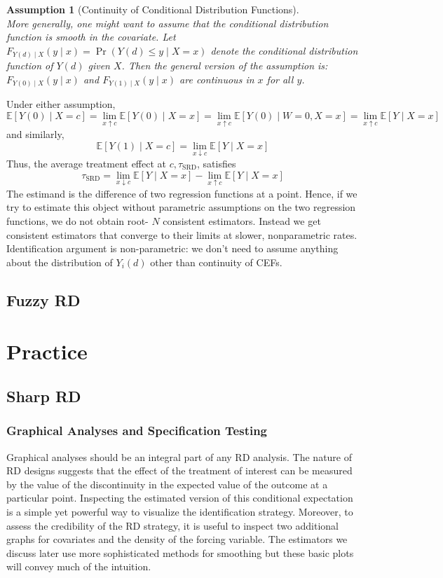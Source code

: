 \documentclass[11pt]{book}%
\newtheorem{assu}{Assumption}
\begin{document}
\begin{assu}[Continuity of Conditional Distribution Functions] 
	~\\
	More generally, one might want to assume that the conditional distribution function is smooth in the covariate. Let $F_{Y(d) \mid X}(y \mid x)=\operatorname{Pr}(Y(d) \leqslant y \mid X=x)$ denote the conditional distribution function of $Y(d)$ given $X$. Then the general version of the assumption is:
$F_{Y(0) \mid X}(y \mid x)$ and $F_{Y(1) \mid X}(y \mid x)$
are continuous in $x$ for all $y$.
\end{assu}
Under either assumption,
$$
\mathbb{E}[Y(0) \mid X=c]=\lim _{x \uparrow c} \mathbb{E}[Y(0) \mid X=x]=\lim _{x \uparrow c} \mathbb{E}[Y(0) \mid W=0, X=x]=\lim _{x \uparrow c} \mathbb{E}[Y \mid X=x]
$$
and similarly,
$$
\mathbb{E}[Y(1) \mid X=c]=\lim _{x \downarrow c} \mathbb{E}[Y \mid X=x]
$$
Thus, the average treatment effect at $c, \tau_{\mathrm{SRD}}$, satisfies
$$
\tau_{\mathrm{SRD}}=\lim _{x \downarrow c} \mathbb{E}[Y \mid X=x]-\lim _{x \uparrow c} \mathbb{E}[Y \mid X=x]
$$
The estimand is the difference of two regression functions at a point. Hence, if we try to estimate this object without parametric assumptions on the two regression functions, we do not obtain root- $N$ consistent estimators. Instead we get consistent estimators that converge to their limits at slower, nonparametric rates.
Identification argument is non-parametric: we don't need to assume anything about the distribution of $Y_{ i}(d)$ other than continuity of CEFs.


\subsection{Fuzzy RD}

\section{Practice}
\subsection{Sharp RD}
\subsubsection{Graphical Analyses and Specification Testing}
Graphical analyses should be an integral part of any RD analysis. The nature of RD designs suggests that the effect of the treatment of interest can be measured by the value of the discontinuity in the expected value of the outcome at a particular point. Inspecting the estimated version of this conditional expectation is a simple yet powerful way to visualize the identification strategy. Moreover, to assess the credibility of the RD strategy, it is useful to inspect two additional graphs for covariates and the density of the forcing variable. The estimators we discuss later use more sophisticated methods for smoothing but these basic plots will convey much of the intuition. 
\end{document}
